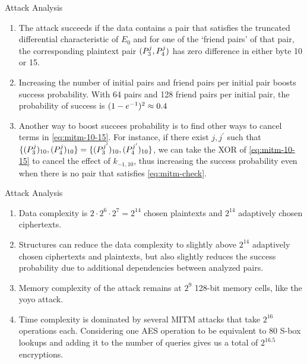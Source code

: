 \documentclass[notheorems]{beamer}
\theoremstyle{definition}
\theoremstyle{example}
\begin{document}
    \begin{frame}[<+->]{Attack Analysis}
        \begin{enumerate}
            \item The attack succeeds if the data contains a pair that satisfies
            the truncated differential characteristic of \(E_0\) and for one of
            the `friend pairs' of that pair, the corresponding plaintext pair
            \((P_3^j, P_4^j)\) has zero difference in either byte 10 or 15.
            \item Increasing the number of initial pairs and friend pairs per
            initial pair boosts success probability. With 64 pairs and 128
            friend pairs per initial pair, the probability of success is
            \((1 - e^{-1})^2 \approx 0.4\)
            \item Another way to boost succees probability is to find other ways
            to cancel terms in \eqref{eq:mitm-10-15}. For instance, if there
            exist \(j, j^\prime\) such that \(\{(P_3^j)_{10},
            (P_4^j)_{10}\} = \{(P_3^{j^\prime})_{10},
            (P_4^{j^\prime})_{10}\}\), we can take the XOR of
            \eqref{eq:mitm-10-15} to cancel the effect of \(k_{-1, 10}\), thus
            increasing the success probability even when there is no pair that
            satisfies \eqref{eq:mitm-check}.
            \seti
        \end{enumerate} 
    \end{frame}

    \begin{frame}[<+->]{Attack Analysis}
        \begin{enumerate}
            \conti
            \item Data complexity is \(2 \cdot 2^6 \cdot 2^7 = 2^{14}\) chosen
            plaintexts and \(2^{14}\) adaptively chosen ciphertexts.
            \item Structures can reduce the data complexity to slightly above
            \(2^{14}\) adaptively chosen ciphertexts and plaintexts, but also
            slightly reduces the success probability due to additional
            dependencies between analyzed pairs.
            \item Memory complexity of the attack remains at \(2^9\) 128-bit
            memory cells, like the yoyo attack.
            \item Time complexity is dominated by several MITM attacks that take
            \(2^{16}\) operations each. Considering one AES operation to be
            equivalent to 80 S-box lookups and adding it to the number of
            queries gives us a total of \(2^{16.5}\) encryptions.
        \end{enumerate} 
    \end{frame}
\end{document}
